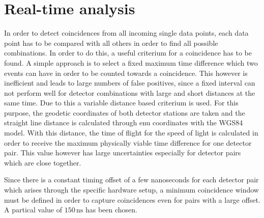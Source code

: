 \documentclass[abstract,toc,los,lof,english,10pt,glossary,acronyms]{jluthesis}
\begin{document}
\section{Real-time analysis}
In order to detect coincidences from all incoming single data points, each data point has to be compared with all others in order to find all possible combinations. In order to do this, a useful criterium for a coincidence has to be found. A simple approach is to select a fixed maximum time difference which two events can have in order to be counted towards a coincidence. This however is inefficient and leads to large numbers of false positives, since a fixed interval can not perform well for detector combinations with large and short distances at the same time. Due to this a variable distance based criterium is used. For this purpose, the geodetic coordinates of both detector stations are taken and the straight line distance is calculated through \acrfull{enu} coordinates with the WGS84 model. With this distance, the time of flight for the speed of light is calculated in order to receive the maximum physically viable time difference for one detector pair. This value however has large uncertainties especially for detector pairs which are close together.

Since there is a constant timing offset of a few nanoseconds for each detector pair which arises through the specific hardware setup, a minimum coincidence window must be defined in order to capture coincidences even for pairs with a large offset. A partical value of $150\,\text{ns}$ has been chosen.
\end{document}
